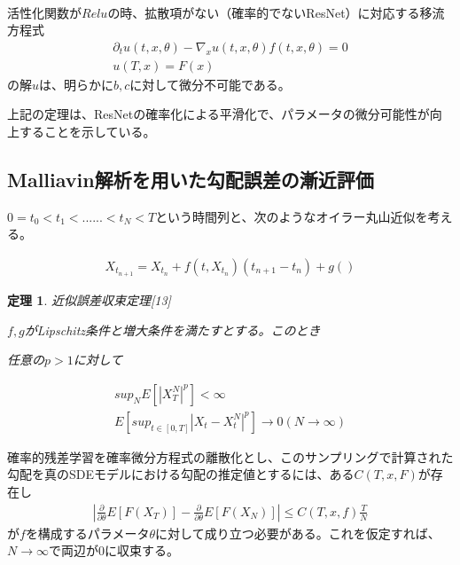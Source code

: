 \documentclass{jsarticle}
\newtheorem{theo}{定理}[section]
\begin{document}
　

活性化関数が$Relu$の時、拡散項がない（確率的でないResNet）に対応する移流方程式
\begin{align}
\partial_t u(t,x,\theta)-\nabla_x u(t,x,\theta)f(t,x,\theta)=0\\
u(T,x)=F(x)
\end{align}
の解$u$は、明らかに$b,c$に対して微分不可能である。

上記の定理は、ResNetの確率化による平滑化で、パラメータの微分可能性が向上することを示している。



\subsection{Malliavin解析を用いた勾配誤差の漸近評価}
$0=t_0<t_1<......<t_N<T$という時間列と、次のようなオイラー丸山近似を考える。

\begin{align}
X_{t_{n+1}}=X_{t_n}+f(t,X_{t_n})(t_{n+1}-t_n)+g()
\end{align}

\begin{theo} 近似誤差収束定理[13]

$f,g$がLipschitz条件と増大条件を満たすとする。このとき

任意の$p>1$に対して 

\begin{align}
sup_NE[|X_T^N|^p]<\infty\\
E[sup_{t\in[0,T]}|X_t-X^N_t|^p]\to 0 (N\to\infty)
\end{align}

\end{theo}





確率的残差学習を確率微分方程式の離散化とし、このサンプリングで計算された勾配を真のSDEモデルにおける勾配の推定値とするには、ある$C(T,x,F)$が存在し
\begin{align}
|\frac{\partial }{\partial \theta}E[F(X_T)]-\frac{\partial }{\partial \theta}E[F(X_N)]|\leq C(T,x,f)\frac{T}{N}
\end{align}
が$f$を構成するパラメータ$\theta$に対して成り立つ必要がある。これを仮定すれば、$N\to\infty$で両辺が0に収束する。
\end{document}
